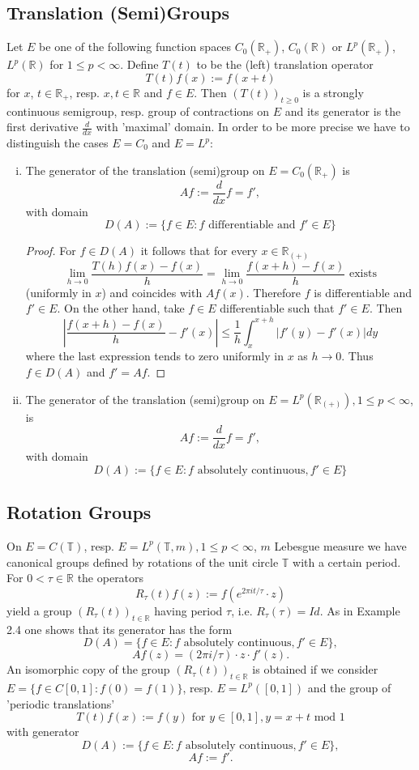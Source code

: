 \subsection{Translation (Semi)Groups}
Let $E$ be one of the following function spaces $C_0(\mathbb{R}_+)$, $C_0(\mathbb{R})$ or $L^p(\mathbb{R}_+)$, $L^p(\mathbb{R})$ for $1 \leq p < \infty$.
Define $T(t)$ to be the (left) translation operator
\[
T(t)f(x) := f(x+t)
\]
for $x$,  $t \in \mathbb{R}_+$, resp. $x,t \in \mathbb{R}$ and $f \in E$.
Then $(T(t))_{t \geq 0}$ is a strongly continuous semigroup, resp. group of contractions on $E$ and its generator is the first derivative $\frac{d}{dx}$ with 'maximal' domain.
In order to be more precise we have to distinguish the cases $E=C_0$ and $E=L^p$:

\begin{enumerate}[(i)]

\item
The generator of the translation (semi)group on $E=C_0(\mathbb{R}_+)$ is
\[
Af := \frac{d}{dx}f = f',
\]
with domain 
\[
D(A) := \{f \in E \colon f \text{ differentiable and } f' \in E\}
\]
\begin{proof} For $f \in D(A)$ it follows that for every $x \in \mathbb{R}_{(+)}$
\[
\lim_{h \to 0} \frac{T(h)f(x)-f(x)}{h} = \lim_{h \to 0} \frac{f(x+h)-f(x)}{h} \text{ exists}
\]
(uniformly in $x$) and coincides with $Af(x)$.
Therefore $f$ is differentiable and $f' \in E$.
On the other hand, take $f \in E$ differentiable such that $f' \in E$.
Then
\[
\left|\frac{f(x+h)-f(x)}{h}-f'(x)\right| \leq \frac{1}{h} \int_{x}^{x+h}|f'(y)-f'(x)| dy
\]
where the last expression tends to zero uniformly in $x$ as $h \to 0$.
Thus $f \in D(A)$ and $f' = Af$.
\end{proof}

\item 
The generator of the translation (semi)group on $E=L^p(\mathbb{R}_{(+)}), 1 \leq p < \infty$, is
\[
Af := \frac{d}{dx}f = f',
\]
with domain
\[
D(A) := \{f \in E \colon f \text{ absolutely continuous}, f' \in E\}
\]
\end{enumerate}
\subsection{Rotation Groups}
On $E=C(\mathbb{T})$, resp. $E=L^p(\mathbb{T},m), 1 \leq p < \infty$, $m$ Lebesgue measure we have canonical groups defined by rotations of the unit circle $\mathbb{T}$ with a certain period.
For $0 < \tau \in \mathbb{R}$ the operators
\[
R_\tau(t)f(z) := f(e^{2\pi it/\tau} \cdot z)
\]
yield a group $(R_\tau(t))_{t \in \mathbb{R}}$ having period $\tau$, i.e. $R_\tau(\tau)=Id$.
As in Example 2.4 one shows that its generator has the form
\[
D(A) = \{f \in E \colon f \text{ absolutely continuous}, f' \in E\},
\]
\[
Af(z) = (2\pi i/\tau) \cdot z \cdot f'(z).
\]
An isomorphic copy of the group $(R_\tau(t))_{t \in \mathbb{R}}$ is obtained if we consider $E=\{f \in C[0,1] \colon f(0)=f(1)\}$, resp. $E=L^p([0,1])$ and the group of 'periodic translations'
\[
T(t)f(x) := f(y) \text{ for } y \in [0,1], y = x+t \text{ mod } 1
\]
with generator
\[
D(A) := \{f \in E \colon f \text{ absolutely continuous}, f' \in E\},
\]
\[
Af := f'.
\]
